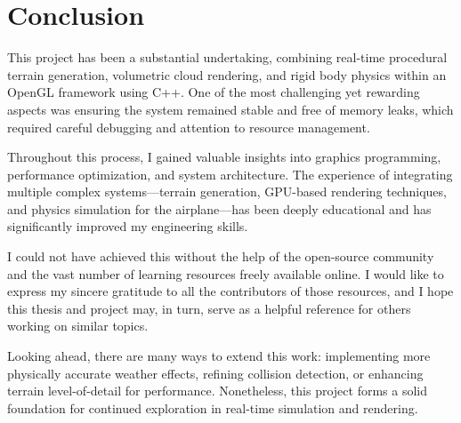 \chapter{Conclusion}
\label{ch:sum}

This project has been a substantial undertaking, combining real-time procedural terrain generation, volumetric cloud rendering, and rigid body physics within an OpenGL framework using C++. One of the most challenging yet rewarding aspects was ensuring the system remained stable and free of memory leaks, which required careful debugging and attention to resource management.

Throughout this process, I gained valuable insights into graphics programming, performance optimization, and system architecture. The experience of integrating multiple complex systems—terrain generation, GPU-based rendering techniques, and physics simulation for the airplane—has been deeply educational and has significantly improved my engineering skills.

I could not have achieved this without the help of the open-source community and the vast number of learning resources freely available online. I would like to express my sincere gratitude to all the contributors of those resources, and I hope this thesis and project may, in turn, serve as a helpful reference for others working on similar topics.

Looking ahead, there are many ways to extend this work: implementing more physically accurate weather effects, refining collision detection, or enhancing terrain level-of-detail for performance. Nonetheless, this project forms a solid foundation for continued exploration in real-time simulation and rendering.